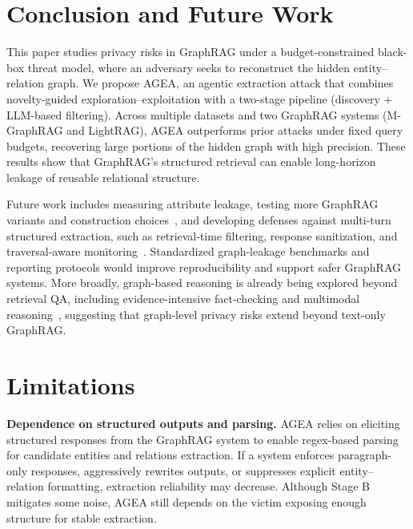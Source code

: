 


\section{Conclusion and Future Work}
This paper studies privacy risks in GraphRAG under a budget-constrained black-box threat model, where an adversary seeks to reconstruct the hidden entity--relation graph. We propose AGEA, an agentic extraction attack that combines novelty-guided exploration--exploitation with a two-stage pipeline (discovery + LLM-based filtering). Across multiple datasets and two GraphRAG systems (M-GraphRAG and LightRAG), AGEA outperforms prior attacks under fixed query budgets, recovering large portions of the hidden graph with high precision. These results show that GraphRAG’s structured retrieval can enable long-horizon leakage of reusable relational structure.

Future work includes measuring attribute leakage, testing more GraphRAG variants and construction choices~\cite{wang2026graphskill}, and developing defenses against multi-turn structured extraction, such as retrieval-time filtering, response sanitization, and traversal-aware monitoring~\cite{wang2026making,song2026subgraph}. Standardized graph-leakage benchmarks and reporting protocols would improve reproducibility and support safer GraphRAG systems. More broadly, graph-based reasoning is already being explored beyond retrieval QA, including evidence-intensive fact-checking and multimodal reasoning~\cite{sengupta2025biomol,zhang2025correct,zhang2026mever}, suggesting that graph-level privacy risks extend beyond text-only GraphRAG.

\section*{Limitations}
\noindent\textbf{Dependence on structured outputs and parsing.}
AGEA relies on eliciting structured responses from the GraphRAG system to enable regex-based parsing for candidate entities and relations extraction. If a system enforces paragraph-only responses, aggressively rewrites outputs, or suppresses explicit entity--relation formatting, extraction reliability may decrease. Although Stage B mitigates some noise, AGEA still depends on the victim exposing enough structure for stable extraction.

